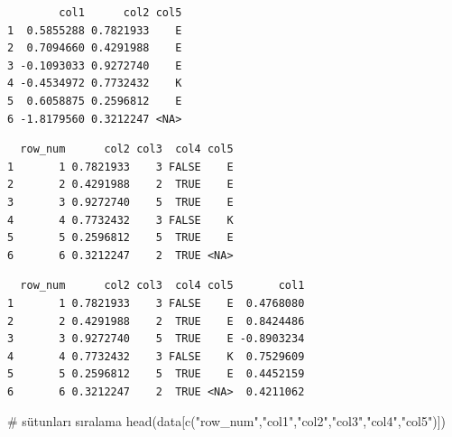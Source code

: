 \documentclass[
  letterpaper,
  DIV=11,
  numbers=noendperiod]{scrreprt}
\newenvironment{Shaded}{\begin{snugshade}}{\end{snugshade}}
\newcommand{\CommentTok}[1]{\textcolor[rgb]{0.37,0.37,0.37}{#1}}
\newcommand{\ConstantTok}[1]{\textcolor[rgb]{0.56,0.35,0.01}{#1}}
\newcommand{\DecValTok}[1]{\textcolor[rgb]{0.68,0.00,0.00}{#1}}
\newcommand{\FunctionTok}[1]{\textcolor[rgb]{0.28,0.35,0.67}{#1}}
\newcommand{\NormalTok}[1]{\textcolor[rgb]{0.00,0.23,0.31}{#1}}
\newcommand{\OtherTok}[1]{\textcolor[rgb]{0.00,0.23,0.31}{#1}}
\newcommand{\SpecialCharTok}[1]{\textcolor[rgb]{0.37,0.37,0.37}{#1}}
\newcommand{\StringTok}[1]{\textcolor[rgb]{0.13,0.47,0.30}{#1}}
\begin{document}
\begin{verbatim}
        col1      col2 col5
1  0.5855288 0.7821933    E
2  0.7094660 0.4291988    E
3 -0.1093033 0.9272740    E
4 -0.4534972 0.7732432    K
5  0.6058875 0.2596812    E
6 -1.8179560 0.3212247 <NA>
\end{verbatim}

\begin{Shaded}
\end{Shaded}

\begin{verbatim}
  row_num      col2 col3  col4 col5
1       1 0.7821933    3 FALSE    E
2       2 0.4291988    2  TRUE    E
3       3 0.9272740    5  TRUE    E
4       4 0.7732432    3 FALSE    K
5       5 0.2596812    5  TRUE    E
6       6 0.3212247    2  TRUE <NA>
\end{verbatim}

\begin{Shaded}
\end{Shaded}

\begin{verbatim}
  row_num      col2 col3  col4 col5       col1
1       1 0.7821933    3 FALSE    E  0.4768080
2       2 0.4291988    2  TRUE    E  0.8424486
3       3 0.9272740    5  TRUE    E -0.8903234
4       4 0.7732432    3 FALSE    K  0.7529609
5       5 0.2596812    5  TRUE    E  0.4452159
6       6 0.3212247    2  TRUE <NA>  0.4211062
\end{verbatim}

\begin{Shaded}
\begin{Highlighting}[]
\CommentTok{\# sütunları sıralama}
\FunctionTok{head}\NormalTok{(data[}\FunctionTok{c}\NormalTok{(}\StringTok{"row\_num"}\NormalTok{,}\StringTok{"col1"}\NormalTok{,}\StringTok{"col2"}\NormalTok{,}\StringTok{"col3"}\NormalTok{,}\StringTok{"col4"}\NormalTok{,}\StringTok{"col5"}\NormalTok{)])}
\end{Highlighting}
\end{Shaded}
\end{document}
